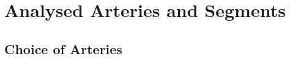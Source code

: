 \providecommand{\clarify}[1]{\textcolor{red}{\textbf{Clarification needed:} #1}}
\section{Analysed Arteries and Segments}

\subsection{Choice of Arteries}
\label{sec:method-population-arteries}

